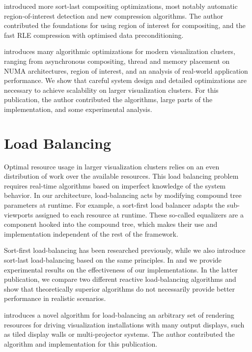 \cite{MEP:10} introduced more sort-last compositing optimizations, most notably
automatic region-of-interest detection and new compression algorithms. The
author contributed the foundations for using region of interest for compositing,
and the fast RLE compression with optimised data preconditioning.

\cite{EBAHMP:12} introduces many algorithmic optimizations for modern
visualization clusters, ranging from asynchronous compositing, thread and memory
placement on NUMA architectures, region of interest, and an analysis of
real-world application performance. We show that careful system design and
detailed optimizations are necessary to achieve scalability on larger
visualization clusters. For this publication, the author contributed the
algorithms, large parts of the implementation, and some experimental analysis.

\section{Load Balancing}

Optimal resource usage in larger visualization clusters relies on an even
distribution of work over the available resources. This load balancing problem
requires real-time algorithms based on imperfect knowledge of the system
behavior. In our architecture, load-balancing acts by modifying compound tree
parameters at runtime. For example, a sort-first load balancer adapts the
sub-viewports assigned to each resource at runtime. These so-called
\textsf{equalizers} are a component hooked into the compound tree, which makes
their use and implementation independent of the rest of the framework.

Sort-first load-balancing has been researched previously, while we also
introduce sort-last load-balancing based on the same principles. In
\cite{EMP:09} and \cite{ESP:18} we provide experimental results on the
effectiveness of our implementations. In the latter publication, we compare two
different reactive load-balancing algorithms and show that theoretically
superior algorithms do not necessarily provide better performance in realistic
scenarios.

\cite{EEP:11} introduces a novel algorithm for load-balancing an arbitrary set
of rendering resources for driving visualization installations with many output
displays, such as tiled display walls or multi-projector systems. The author
contributed the algorithm and implementation for this publication.

